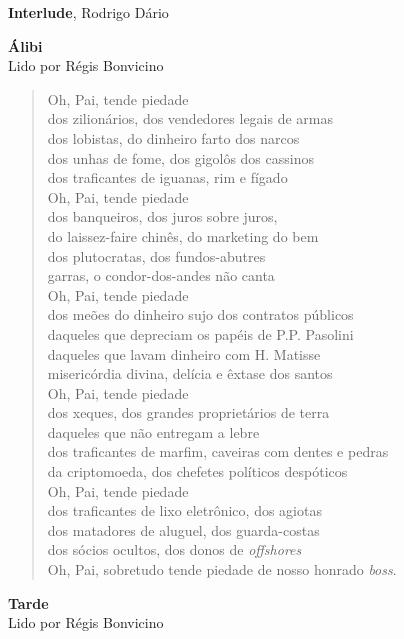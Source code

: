 \pagebreak

\textbf{Interlude}, Rodrigo Dário

\textbf{Álibi}\\
Lido por Régis Bonvicino

\begin{verse}
Oh, Pai, tende piedade\\
dos zilionários, dos vendedores legais de armas\\
dos lobistas, do dinheiro farto dos narcos\\
dos unhas de fome, dos gigolôs dos cassinos\\
dos traficantes de iguanas, rim e fígado\\[5pt]
Oh, Pai, tende piedade\\
dos banqueiros, dos juros sobre juros,\\
do laissez-faire chinês, do marketing do bem\\
dos plutocratas, dos fundos-abutres\\
garras, o condor-dos-andes não canta\\[5pt]
Oh, Pai, tende piedade\\
dos meões do dinheiro sujo dos contratos públicos\\
daqueles que depreciam os papéis de P.P. Pasolini\\
daqueles que lavam dinheiro com H. Matisse\\
misericórdia divina, delícia e êxtase dos santos\\[5pt]
Oh, Pai, tende piedade\\
dos xeques, dos grandes proprietários de terra\\
daqueles que não entregam a lebre\\
dos traficantes de marfim, caveiras com dentes e pedras\\
da criptomoeda, dos chefetes políticos despóticos\\[5pt]
Oh, Pai, tende piedade\\
dos traficantes de lixo eletrônico, dos agiotas\\
dos matadores de aluguel, dos guarda-costas\\
dos sócios ocultos, dos donos de \emph{offshores}\\
Oh, Pai, sobretudo tende piedade de nosso honrado \emph{boss}.
\end{verse}

\pagebreak

\textbf{Tarde}\\
Lido por Régis Bonvicino

